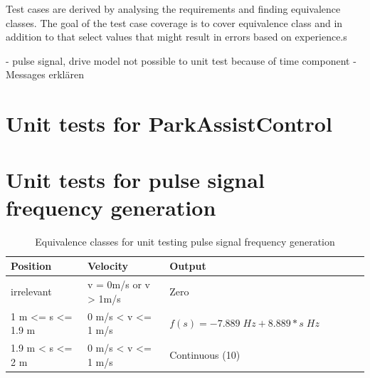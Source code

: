 Test cases are derived by analysing the requirements and finding equivalence classes.
The goal of the test case coverage is to cover equivalence class and in addition to that select values that might result in errors based on experience.s

- pulse signal, drive model not possible to unit test because of time component
- Messages erklären\\

\section{Unit tests for ParkAssistControl}

\section{Unit tests for pulse signal frequency generation}

\begin{table}[H]
\centering
\caption{Equivalence classes for unit testing pulse signal frequency generation}
\begin{adjustbox}{width=1\textwidth, center=\textwidth}
\renewcommand{\arraystretch}{1}
\begin{tabular}{lllllll}
\textbf{Position} & \textbf{Velocity} & \textbf{Output} \\\hline
irrelevant & v = 0m/s or v > 1m/s & Zero\\
1 m <= s <= 1.9 m  & 0 m/s < v <= 1 m/s & $f(s)=-7.889\; Hz + 8.889*s\; Hz$\\
1.9 m < s <= 2 m  & 0 m/s < v <= 1 m/s & Continuous (10)
\end{tabular}
\end{adjustbox}
\end{table}

